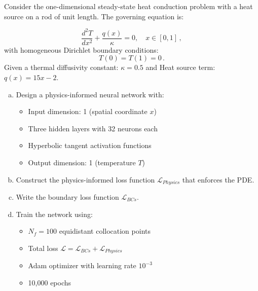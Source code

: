 \begin{problemset}

\begin{problem}
Consider the one-dimensional steady-state heat conduction problem with a heat source on a rod of unit length. The governing equation is:

\begin{equation*}
\frac{d^2T}{dx^2} + \frac{q(x)}{\kappa} = 0, \quad x \in [0,1]\,,
\end{equation*}
with homogeneous Dirichlet boundary conditions:
\begin{equation*}
T(0) = T(1) = 0\,.
\end{equation*}
Given a thermal diffusivity constant: $\kappa = 0.5$
and Heat source term: $q(x) = 15x - 2$.\\

\noindent
\begin{enumerate}[a)]

\item Design a physics-informed neural network with:

    \begin{itemize}
    \item Input dimension: 1 (spatial coordinate $x$)
    \item Three hidden layers with 32 neurons each
    \item Hyperbolic tangent activation functions
    \item Output dimension: 1 (temperature $T$)
    \end{itemize}

\item Construct the physics-informed loss function $\mathcal{L}_{Physics}$ that enforces the PDE.

\item Write the boundary loss function $\mathcal{L}_{BCs}$.

\item Train the network using:
    \begin{itemize}
    \item $N_f = 100$ equidistant collocation points
    \item Total loss $\mathcal{L} = \mathcal{L}_{BCs} + \mathcal{L}_{Physics}$
    \item Adam optimizer with learning rate $10^{-3}$
    \item 10,000 epochs
    \end{itemize}


\end{enumerate}
\end{problem}
\end{problemset}
